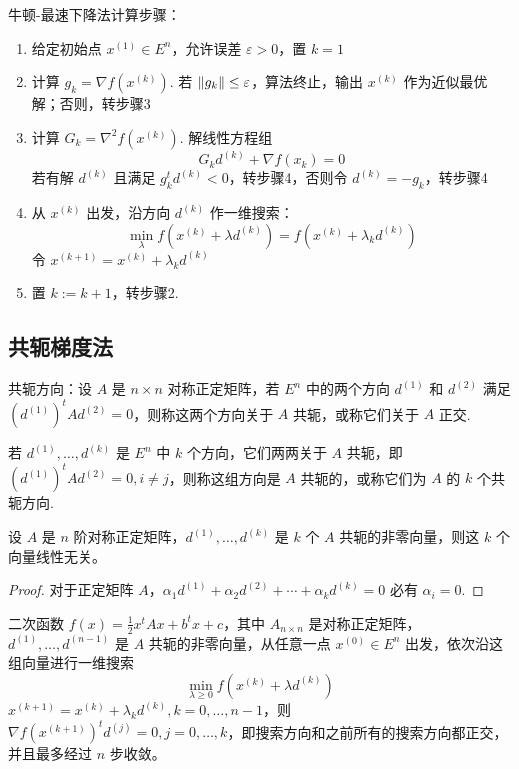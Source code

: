 \begin{remark}
    牛顿-最速下降法计算步骤：\begin{enumerate}
        \item 给定初始点 $x^{(1)} \in E^n$，允许误差 $\varepsilon > 0$，置 $k = 1$
        \item 计算 $g_k = \nabla f(x^{(k)})$. 若 $\norm{g_k} \le \varepsilon$，算法终止，输出 $x^{(k)}$ 作为近似最优解；否则，转步骤3
        \item 计算 $G_k = \nabla^2f(x^{(k)})$. 解线性方程组\[G_kd^{(k)} + \nabla f(x_k) = 0\] 若有解 $d^{(k)}$ 且满足 $g_k^td^{(k)} < 0$，转步骤4，否则令 $d^{(k)} = -g_k$，转步骤4
        \item 从 $x^{(k)}$ 出发，沿方向 $d^{(k)}$ 作一维搜索：\[\min_{\lambda} f(x^{(k)} + \lambda d^{(k)}) = f(x^{(k)} + \lambda_k d^{(k)})\] 令 $x^{(k + 1)} = x^{(k)} + \lambda_k d^{(k)}$
        \item 置 $k := k + 1$，转步骤2.
    \end{enumerate}
\end{remark}

\subsection{共轭梯度法}
\begin{remark}
    共轭方向：设 $A$ 是 $n \times n$ 对称正定矩阵，若 $E^n$ 中的两个方向 $d^{(1)}$ 和 $d^{(2)}$ 满足 $(d^{(1)})^tAd^{(2)} = 0$，则称这两个方向关于 $A$ 共轭，或称它们关于 $A$ 正交.

    若 $d^{(1)}, \dots, d^{(k)}$ 是 $E^n$ 中 $k$ 个方向，它们两两关于 $A$ 共轭，即 $(d^{(1)})^tAd^{(2)} = 0, i \neq j$，则称这组方向是 $A$ 共轭的，或称它们为 $A$ 的 $k$ 个共轭方向.
\end{remark}

\begin{theorem}
    设 $A$ 是 $n$ 阶对称正定矩阵，$d^{(1)}, \dots, d^{(k)}$ 是 $k$ 个 $A$ 共轭的非零向量，则这 $k$ 个向量线性无关。
    \begin{proof}
        对于正定矩阵 $A$，$\alpha_{1} d^{(1)}+\alpha_{2} d^{(2)}+\cdots+\alpha_{k} d^{(k)}=0$ 必有 $\alpha_i = 0$.
    \end{proof}
\end{theorem}

\begin{theorem}
    二次函数 $f(x) = \frac{1}{2}x^tAx + b^tx + c$，其中 $A_{n \times n}$ 是对称正定矩阵，$d^{(1)}, \dots, d^{(n - 1)}$ 是 $A$ 共轭的非零向量，从任意一点 $x^{(0)} \in E^n$ 出发，依次沿这组向量进行一维搜索\[\underset{\lambda \ge 0}{\min} f(x^{(k)} + \lambda d^{(k)})\]$x^{(k + 1)} = x^{(k)} + \lambda_k d^{(k)}, k = 0, \dots, n - 1$，则 $\nabla f(x^{(k + 1)})^t d^{(j)} = 0, j = 0, \dots, k$，即搜索方向和之前所有的搜索方向都正交，并且最多经过 $n$ 步收敛。
\end{theorem}

